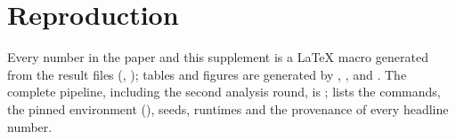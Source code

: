 \documentclass[onecolumn,10pt]{IEEEtran}
\begin{document}
\section{Reproduction}
\label{sec:s_repro}
Every number in the paper and this supplement is a LaTeX macro generated from the result files (, ); tables and figures are generated by , ,  and .
The complete pipeline, including the second analysis round, is ;  lists the commands, the pinned environment (), seeds, runtimes and the provenance of every headline number.
\end{document}
